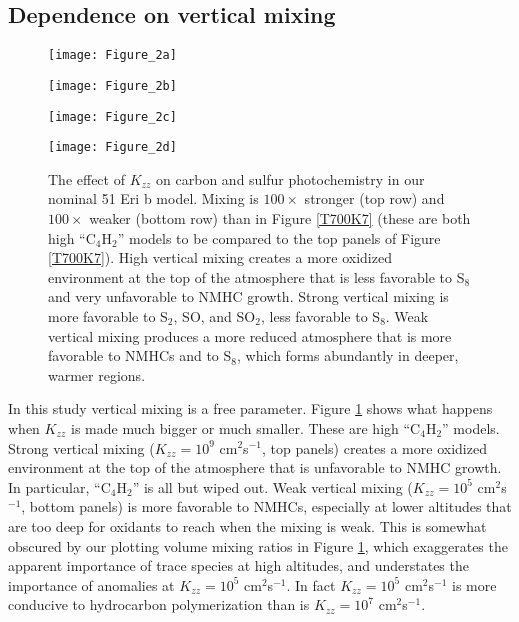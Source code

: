 \documentclass[preprint]{aastex6}
\newcounter{reaction}
\begin{document}
\subsection{Dependence on vertical mixing}

\begin{figure}[!htb]
 \centering
 \begin{minipage}[c]{0.49\textwidth}
   \centering
  \texttt{[image: Figure\_2a]} 
 \end{minipage}
 \begin{minipage}[c]{0.49\textwidth}
   \centering
 \texttt{[image: Figure\_2b]} 
 \end{minipage}
 \centering
 \begin{minipage}[c]{0.49\textwidth}
   \centering
 \texttt{[image: Figure\_2c]} 
 \end{minipage}
 \begin{minipage}[c]{0.49\textwidth}
   \centering
 \texttt{[image: Figure\_2d]} 
 \end{minipage}
 \caption{\small The effect of $K_{zz}$ on carbon and sulfur photochemistry in our nominal 51 Eri b model.
Mixing is $100\times$ stronger (top row) and $100\times$ weaker (bottom row) than in Figure \ref{T700K7}
(these are both high ``C$_4$H$_2$'' models to be compared to the top panels of Figure \ref{T700K7}).
High vertical mixing creates a more oxidized environment at the top of the atmosphere
  that is less favorable to S$_8$ and very unfavorable to NMHC growth.  
   Strong vertical mixing is more favorable to S$_2$, SO, and SO$_2$, less favorable to S$_8$. 
  Weak vertical mixing produces a more reduced atmosphere that 
  is more favorable to NMHCs and to S$_8$, which forms abundantly in deeper, warmer regions.
 }
\label{4Kzz}
\end{figure}

In this study vertical mixing is a free parameter.
Figure \ref{4Kzz} shows what happens when $K_{zz}$ is made much bigger or much smaller.
These are high ``C$_4$H$_2$'' models. %
   Strong vertical mixing ($K_{zz}=10^9$ cm$^2$s$^{-1}$, top panels) 
   creates a more oxidized environment at the top of the atmosphere that is unfavorable to NMHC growth.
   In particular, ``C$_4$H$_2$'' is all but wiped out.
  Weak vertical mixing ($K_{zz}=10^5$ cm$^2$s$^{-1}$, bottom panels) is more favorable to NMHCs,
   especially at lower altitudes that are too deep for oxidants to reach when the mixing is weak.
  This is somewhat obscured by our plotting volume mixing ratios in Figure \ref{4Kzz},
  which exaggerates the apparent importance of trace species at high altitudes,
  and understates the importance of anomalies %
  at $K_{zz}=10^5$ cm$^2$s$^{-1}$. 
  In fact $K_{zz}=10^5$ cm$^2$s$^{-1}$ is more conducive to hydrocarbon polymerization than is $K_{zz}=10^7$ cm$^2$s$^{-1}$. 
\end{document}
